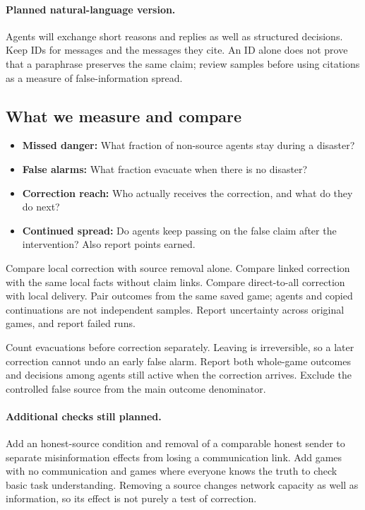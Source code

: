 \documentclass[11pt]{article}
\begin{document}
\paragraph{Planned natural-language version.}
Agents will exchange short reasons and replies as well as structured decisions. Keep IDs for messages and the messages they cite. An ID alone does not prove that a paraphrase preserves the same claim; review samples before using citations as a measure of false-information spread.

\subsection{What we measure and compare}
\begin{itemize}
\item \textbf{Missed danger:} What fraction of non-source agents stay during a disaster?
\item \textbf{False alarms:} What fraction evacuate when there is no disaster?
\item \textbf{Correction reach:} Who actually receives the correction, and what do they do next?
\item \textbf{Continued spread:} Do agents keep passing on the false claim after the intervention? Also report points earned.
\end{itemize}
Compare local correction with source removal alone. Compare linked correction with the same local facts without claim links. Compare direct-to-all correction with local delivery. Pair outcomes from the same saved game; agents and copied continuations are not independent samples. Report uncertainty across original games, and report failed runs.

Count evacuations before correction separately. Leaving is irreversible, so a later correction cannot undo an early false alarm. Report both whole-game outcomes and decisions among agents still active when the correction arrives. Exclude the controlled false source from the main outcome denominator.

\paragraph{Additional checks still planned.}
Add an honest-source condition and removal of a comparable honest sender to separate misinformation effects from losing a communication link. Add games with no communication and games where everyone knows the truth to check basic task understanding. Removing a source changes network capacity as well as information, so its effect is not purely a test of correction.
\end{document}
